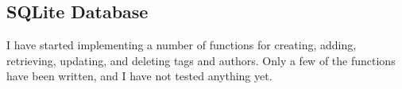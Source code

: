 \subsection{SQLite Database}
\label{task:20140320_jkn0}
I have started implementing a number of functions for creating, adding, retrieving, updating, and deleting tags and authors. Only a few of the functions have been written, and I have not tested anything yet. 
